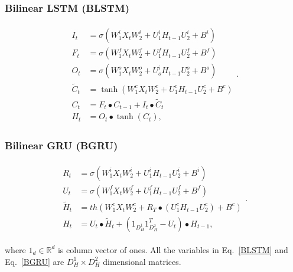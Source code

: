 \documentclass[a4paper,11pt]{article}
\begin{document}
\subsubsection{Bilinear LSTM (BLSTM)} 
\begin{align}
\begin{split}
\label{BLSTM}
I_{t} &=\sigma(W_{1}^{i}X_{t}W_{2}^{i} + U_{1}^{i}H_{t-1}U_{2}^{i}  +  B^{i})\\
F_{t} &=\sigma(W_{1}^{f}X_{t}W_{2}^{f} + U_{1}^{f}H_{t-1}U_{2}^{f}  +  B^{f})\\
O_{t} &=\sigma(W_{1}^{o}X_{t}W_{2}^{o} + U_{o}^{i}H_{t-1}U_{2}^{o}  +  B^{o})\\
\tilde{C}_{t} &=\tanh(W_{1}^{c}X_{t}W_{2}^{c} + U_{1}^{c}H_{t-1}U_{2}^{c}  +  B^{c})\\
C_{t} &= F_{t} \bullet C_{t-1} + I_{t} \bullet \tilde{C}_{t}\\
H_{t} &= O_{t}\bullet \tanh(C_{t}),
\end{split}.
\end{align}



\subsubsection{Bilinear GRU (BGRU)} 
\begin{align}
\begin{split}
\label{BGRU}
R_{t} &=\sigma(W_{1}^{i}X_{t}W_{2}^{i} + U_{1}^{i}H_{t-1}U_{2}^{i}  +  B^{i})\\
U_{t} &=\sigma(W_{1}^{f}X_{t}W_{2}^{f} + U_{1}^{f}H_{t-1}U_{2}^{f}  +  B^{f})\\
\tilde{H}_{t} &= th(W_{1}^{c}X_{t}W_{2}^{c} + R_{T} \bullet (U_{1}^{c}H_{t-1}U_{2}^{c})  +  B^{c})\\
H_{t} &= U_{t}\bullet \tilde{H}_{t} + (1_{D_{H}^{1}}1_{D_{H}^{2}}^{T} - U_{t})\bullet H_{t-1},
\end{split}.
\end{align}

\noindent where $1_{d} \in \mathbb{R}^{d}$ is column vector of ones. All the variables in Eq.~\eqref{BLSTM} and Eq.~\eqref{BGRU} are $D_{H}^{1} \times D_{H}^{2}$ dimensional matrices.

\end{document}
